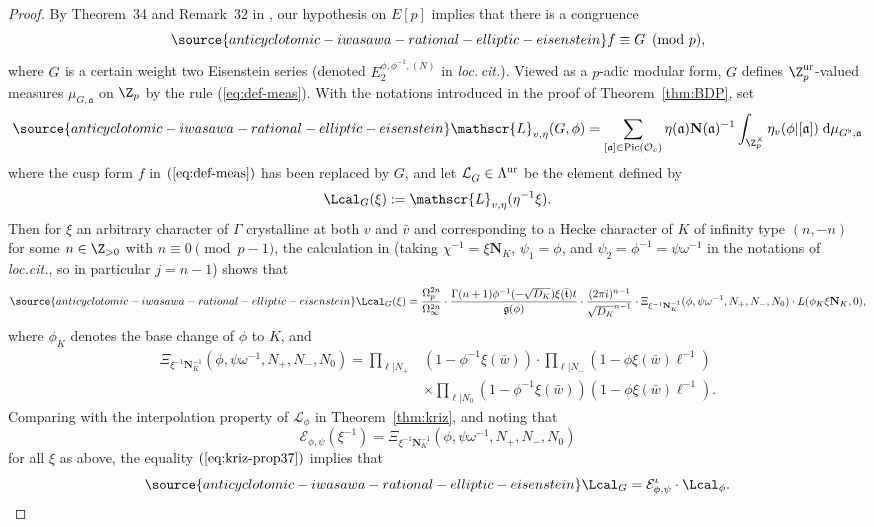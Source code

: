 \begin{proof}
By Theorem~34 and Remark~32 in \cite{kriz}, our hypothesis on $E[p]$ implies that there is a congruence
\begin{equation}\label{eq:cong-mf}
\source{anticyclotomic-iwasawa-rational-elliptic-eisenstein}
f\equiv G^{}\pmod{p},
\end{equation}
where $G^{}$ is a certain weight two Eisenstein series (denoted $E_{2}^{\phi,\phi^{-1},(N)}$ in \emph{loc.\,cit.}).
Viewed as a $p$-adic modular form, $G$ defines $\Z_p^{\rm ur}$-valued measures $\mu_{G,\mathfrak{a}}$
on $\Z_p$ by the rule (\ref{eq:def-meas}). With the notations introduced in the proof of Theorem~\ref{thm:BDP}, set
\begin{equation}\label{eq:Eis-measure}
\source{anticyclotomic-iwasawa-rational-elliptic-eisenstein}
\mathscr{L}_{v,\eta}(G,\phi)=
\sum_{[\mathfrak{a}]\in\mathrm{Pic}(\mathcal{O}_c)}
\eta(\mathfrak{a})\mathbf{N}(\mathfrak{a})^{-1}
\int_{\Z_p^\times}\eta_v(\phi\vert[\mathfrak{a}])\;\mathrm{d}\mu_{G^\flat,{\mathfrak{a}}}
\end{equation}
where the cusp form $f$ in $(\ref{eq:def-meas})$ has been replaced by $G$, and let $\mathcal{L}_G^{}\in\Lambda^{\rm ur}$ be the element defined by
\[
\Lcal_G(\xi):=\mathscr{L}_{v,\eta}(\eta^{-1}\xi).
\]
Then for $\xi$ an arbitrary character of $\Gamma$ crystalline at both $v$ and $\bar{v}$ and corresponding to a Hecke character of $K$ of infinity type $(n,-n)$ for some $n\in\Z_{>0}$ with $n\equiv 0\pmod{p-1}$, the calculation in \cite[Prop.~37]{kriz} (taking $\chi^{-1}=\xi\mathbf{N}_K$, $\psi_1=\phi$, and $\psi_2=\phi^{-1}=\psi\omega^{-1}$ in the notations of \emph{loc.cit.}, so in particular $j=n-1$) shows that
\begin{equation}\label{eq:kriz-prop37}
\source{anticyclotomic-iwasawa-rational-elliptic-eisenstein}
\Lcal_G(\xi)=\frac{\Omega_p^{2n}}{\Omega_\infty^{2n}}\cdot\frac{\Gamma(n+1)\phi^{-1}(-\sqrt{D_K})\xi(\bar{\mathfrak{t}})t}{\mathfrak{g}(\phi)}\cdot\frac{(2\pi i)^{n-1}}{\sqrt{D_K}^{n-1}}\cdot
\Xi_{\xi^{-1}\mathbf{N}_K^{-1}}(\phi,\psi\omega^{-1},N_+,N_-,N_0)\cdot L(\phi_K\xi\mathbf{N}_K,0),
\end{equation}
where $\phi_K$ denotes the base change of $\phi$ to $K$, and
\begin{align*}
\Xi_{\xi^{-1}\mathbf{N}_K^{-1}}(\phi,\psi\omega^{-1},N_+,N_-,N_0)=\prod_{\ell\vert N_+}&(1-\phi^{-1}\xi(\bar{w}))\cdot\prod_{\ell\vert N_-}(1-\phi\xi(\bar{w})\ell^{-1})\\
&\times\prod_{\ell\vert N_0}(1-\phi^{-1}\xi(\bar{w}))(1-\phi\xi(\bar{w})\ell^{-1}).
\end{align*}
Comparing with the interpolation property of $\mathcal{L}_\phi$ in Theorem~\ref{thm:kriz}, and noting that
\[
\mathcal{E}_{\phi,\psi}(\xi^{-1})=\Xi_{\xi^{-1}\mathbf{N}_K^{-1}}(\phi,\psi\omega^{-1},N_+,N_-,N_0)
\]
for all $\xi$ as above, the equality $(\ref{eq:kriz-prop37})$ implies that
\begin{equation}\label{eq:cor-37}
\source{anticyclotomic-iwasawa-rational-elliptic-eisenstein}
\Lcal_G = \mathcal{E}_{\phi,\psi}^\iota\cdot\Lcal_\phi.
\end{equation}


\end{proof}
